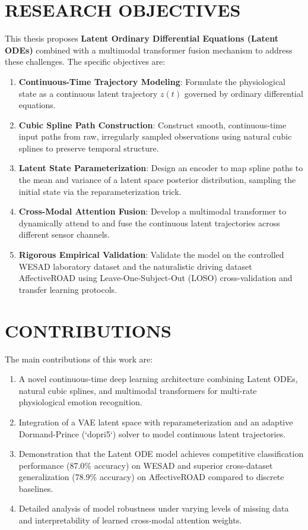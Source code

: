 \documentclass[12pt, a4paper]{report}
\numberwithin{equation}{chapter}
\begin{document}
\section{RESEARCH OBJECTIVES}
This thesis proposes \textbf{Latent Ordinary Differential Equations (Latent ODEs)} combined with a multimodal transformer fusion mechanism to address these challenges. The specific objectives are:
\begin{enumerate}
    \item \textbf{Continuous-Time Trajectory Modeling}: Formulate the physiological state as a continuous latent trajectory $z(t)$ governed by ordinary differential equations.
    \item \textbf{Cubic Spline Path Construction}: Construct smooth, continuous-time input paths from raw, irregularly sampled observations using natural cubic splines to preserve temporal structure.
    \item \textbf{Latent State Parameterization}: Design an encoder to map spline paths to the mean and variance of a latent space posterior distribution, sampling the initial state via the reparameterization trick.
    \item \textbf{Cross-Modal Attention Fusion}: Develop a multimodal transformer to dynamically attend to and fuse the continuous latent trajectories across different sensor channels.
    \item \textbf{Rigorous Empirical Validation}: Validate the model on the controlled WESAD laboratory dataset and the naturalistic driving dataset AffectiveROAD using Leave-One-Subject-Out (LOSO) cross-validation and transfer learning protocols.
\end{enumerate}

\section{CONTRIBUTIONS}
The main contributions of this work are:
\begin{enumerate}
    \item A novel continuous-time deep learning architecture combining Latent ODEs, natural cubic splines, and multimodal transformers for multi-rate physiological emotion recognition.
    \item Integration of a VAE latent space with reparameterization and an adaptive Dormand-Prince (`dopri5`) solver to model continuous latent trajectories.
    \item Demonstration that the Latent ODE model achieves competitive classification performance (87.0\% accuracy) on WESAD and superior cross-dataset generalization (78.9\% accuracy) on AffectiveROAD compared to discrete baselines.
    \item Detailed analysis of model robustness under varying levels of missing data and interpretability of learned cross-modal attention weights.
\end{enumerate}
\end{document}
